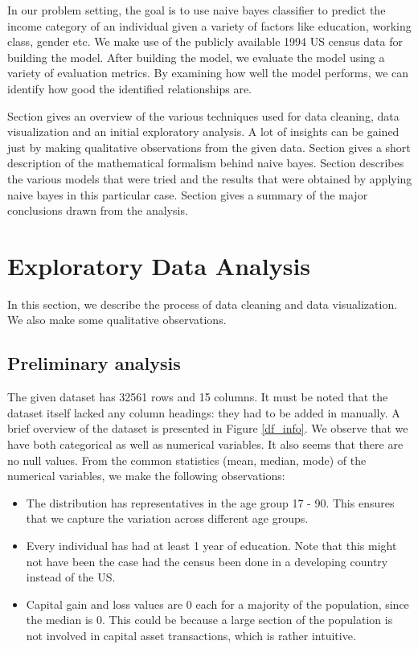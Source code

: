 \documentclass[conference]{IEEEtran}
\newcommand{\rom}[1]{\uppercase\expandafter{\romannumeral #1\relax}}
\begin{document}
In our problem setting, the goal is to use naive bayes classifier to predict the income category of an individual given a variety of factors like education, working class, gender etc. We make use of the publicly available 1994 US census data for building the model. After building the model, we evaluate the model using a variety of evaluation metrics. By examining how well the model performs, we can identify how good the identified relationships are.


Section \rom{2} gives an overview of the various techniques used for data cleaning, data visualization and an initial exploratory analysis. A lot of insights can be gained just by making qualitative observations from the given data. Section \rom{3} gives a short description of the mathematical formalism behind naive bayes. Section \rom{4} describes the various models that were tried and the results that were obtained by applying naive bayes in this particular case. Section \rom{5} gives a summary of the major conclusions drawn from the analysis.


\section{Exploratory Data Analysis}

In this section, we describe the process of data cleaning and data visualization. We also make some qualitative observations.

\subsection{Preliminary analysis}

The given dataset has 32561 rows and 15 columns. It must be noted that the dataset itself lacked any column headings: they had to be added in manually. A brief overview of the dataset is presented in Figure \ref{df_info}. We observe that we have both categorical as well as numerical variables. It also seems that there are no null values. From the common statistics (mean, median, mode) of the numerical variables, we make the following observations:

\begin{itemize}
    \item The distribution has representatives in the age group 17 - 90. This ensures that we capture the variation across different age groups.
    \item Every individual has had at least 1 year of education. Note that this might not have been the case had the census been done in a developing country instead of the US.
    \item Capital gain and loss values are 0 each for a majority of the population, since the median is 0. This could be because a large section of the population is not involved in capital asset transactions, which is rather intuitive.
\end{itemize}
\end{document}
